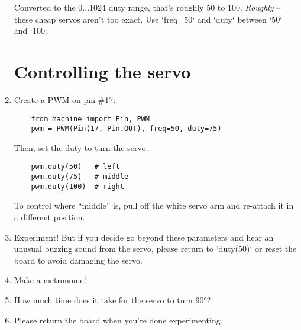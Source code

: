 \documentclass{../tutorial}
\begin{document}
\begin{enumerate}
{        Converted to the $0...1024$ duty range, that's roughly $50$ to $100$.
        \emph{Roughly} – these cheap servos aren't too exact.
    }
    Use `freq=50` and `duty` between `50` and `100`.


\section{Controlling the servo}

\item
    Create a PWM on pin \#17:

    \begin{lstlisting}
    from machine import Pin, PWM
    pwm = PWM(Pin(17, Pin.OUT), freq=50, duty=75)
    \end{lstlisting}

    Then, set the duty to turn the servo:

    \begin{lstlisting}
    pwm.duty(50)   # left
    pwm.duty(75)   # middle
    pwm.duty(100)  # right
    \end{lstlisting}

    To control where “middle” is, pull off the white servo arm and re-attach it
    in a different position.

\item
    Experiment! But if you decide go beyond these parameters and hear an
    unusual buzzing sound from the servo, please return to `duty(50)` or reset
    the board to avoid damaging the servo.

\item
    Make a metronome!

\item
    How much time does it take for the servo to turn 90°?

    \begin{comment}
        The servo doesn't give any notification when it's done turning.
        You'll need a watch.
    \end{comment}

\clearpage


\item
    Please return the board when you're done experimenting.


\end{enumerate}
\end{document}
